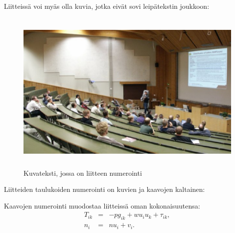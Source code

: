 \documentclass[english,12pt,a4paper,pdftex]{article}
\begin{document}
\renewcommand{\theequation}{B\arabic{equation}}
\setcounter{equation}{0}
\renewcommand{\thefigure}{B\arabic{figure}}
\setcounter{figure}{0}
\renewcommand{\thetable}{B\arabic{table}}
\setcounter{table}{0}

Liitteissä voi myäs olla kuvia, jotka
eivät sovi leipätekstin joukkoon:
\begin{figure}[htb]
\begin{center}
\includegraphics[height=8cm]{assets/kuva2}
\end{center}
\caption{Kuvateksti, jossa on liitteen numerointi \label{liitekuva}}
\end{figure}
Liitteiden taulukoiden numerointi on kuvien ja kaavojen kaltainen:
\begin{table}[htb]
\caption{Taulukon kuvateksti. \label{liitetaulukko}}
\begin{center}
\end{center}
\end{table}
Kaavojen numerointi muodostaa liitteissä oman kokonaisuutensa:
\begin{eqnarray}
T_{ik} &=& -p g_{ik} + w u_i u_k + \tau_{ik},  \label{liitekaava3} \\
n_i    &=& n u_i + v_i.                        \label{liitekaava4}
\end{eqnarray}
\end{document}
